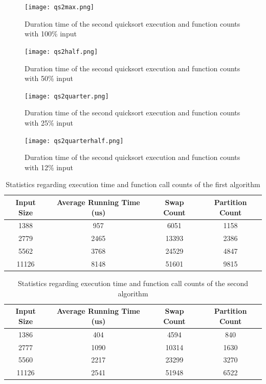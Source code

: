 \begin{figure}[H]
\begin{center}
\leavevmode
\texttt{[image: qs2max.png]}
\caption{Duration time of the second quicksort execution and function counts with 100\% input }
\label{qs_max}
\end{center}
\end{figure}
\begin{figure}[H]
\begin{center}
\leavevmode
\texttt{[image: qs2half.png]}
\caption{Duration time of the second quicksort execution and function counts with 50\% input }
\label{qs_half}
\end{center}
\end{figure}
\begin{figure}[H]
\begin{center}
\leavevmode
\texttt{[image: qs2quarter.png]}
\caption{Duration time of the second quicksort execution and function counts with 25\% input }
\label{qs_quarter}
\end{center}
\end{figure}
\begin{figure}[H]
\begin{center}
\leavevmode
\texttt{[image: qs2quarterhalf.png]}
\caption{Duration time of the second quicksort execution and function counts with 12\% input }
\label{qs_qhalf}
\end{center}
\end{figure}
\begin{table}
\begin{center}
\begin{tabular}{|c c c c|}
 \hline
    Input Size & Average Running Time (us) & Swap Count & Partition Count\\ [0.5ex]
 \hline
    1388 & 957 & 6051 & 1158\\
    2779 & 2465 & 13393 & 2386\\
    5562 & 3768 & 24529 & 4847\\
    11126 & 8148 & 51601 & 9815 \\[1ex]
 \hline
\end{tabular}
\end{center}
    \caption{Statistics regarding execution time and function call counts of the first algorithm}
    \label{stats1}
\end{table}
\begin{table}
\begin{center}
\begin{tabular}{|c c c c|}
 \hline
    Input Size & Average Running Time (us) & Swap Count & Partition Count\\ [0.5ex]
 \hline
    1386 & 404 & 4594 & 840\\
    2777 & 1090 & 10314 & 1630\\
    5560 & 2217 & 23299 & 3270\\
    11126 & 2541 & 51948 & 6522 \\[1ex]
 \hline
\end{tabular}
\end{center}
    \caption{Statistics regarding execution time and function call counts of the second algorithm}
    \label{stats2}
\end{table}
